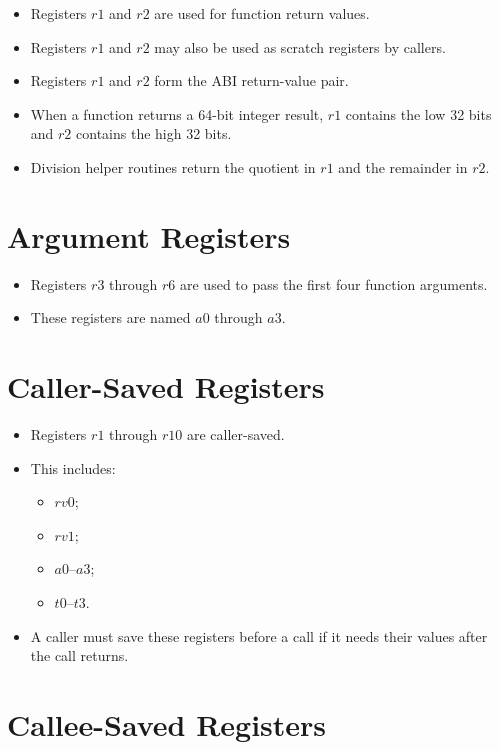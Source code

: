 \begin{itemize}
  \item Registers \(r1\) and \(r2\) are used for function return values.
  \item Registers \(r1\) and \(r2\) may also be used as scratch registers by callers.
  \item Registers \(r1\) and \(r2\) form the ABI return-value pair.
  \item When a function returns a 64-bit integer result, \(r1\) contains the low 32 bits and \(r2\) contains the high 32 bits.
  \item Division helper routines return the quotient in \(r1\) and the remainder in \(r2\).
\end{itemize}

\section{Argument Registers}

\begin{itemize}
  \item Registers \(r3\) through \(r6\) are used to pass the first four function arguments.
  \item These registers are named \(a0\) through \(a3\).
\end{itemize}

\section{Caller-Saved Registers}

\begin{itemize}
  \item Registers \(r1\) through \(r10\) are caller-saved.
  \item This includes:
  \begin{itemize}
    \item \(rv0\);
    \item \(rv1\);
    \item \(a0\)--\(a3\);
    \item \(t0\)--\(t3\).
  \end{itemize}
  \item A caller must save these registers before a call if it needs their values after the call returns.
\end{itemize}

\section{Callee-Saved Registers}

